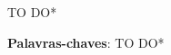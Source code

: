 \begin{resumo}
TO DO*
 \vspace{\onelineskip}

 \noindent
 \textbf{Palavras-chaves}: TO DO*
\end{resumo}
